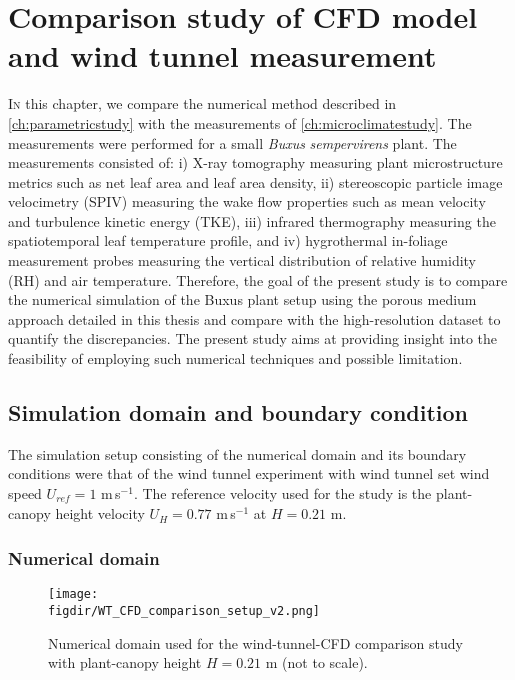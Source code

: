 \chapter{Comparison study of CFD model and wind tunnel measurement}
\label{ch:wtcfdcomparison}
\def\figdir{chapters/ch06_wtcfdcomparison/figures}	


\lettrine[lines=3,nindent=0em,loversize=0.1]{I}{n} this chapter, we compare the numerical method described in \cref{ch:parametricstudy} with the measurements of \cref{ch:microclimatestudy}. The measurements were performed for a small \textit{Buxus} \textit{sempervirens} plant. The measurements consisted of: i) X-ray tomography measuring plant microstructure metrics such as net leaf area and leaf area density, ii) stereoscopic particle image velocimetry (SPIV) measuring the wake flow properties such as mean velocity and turbulence kinetic energy (TKE), iii) infrared thermography measuring the spatiotemporal leaf temperature profile, and iv) hygrothermal in-foliage measurement probes measuring the vertical distribution of relative humidity (RH) and air temperature. Therefore, the goal of the present study is to compare the numerical simulation of the Buxus plant setup using the porous medium approach detailed in this thesis and compare with the high-resolution dataset to quantify the discrepancies. The present study aims at providing insight into the feasibility of employing such numerical techniques and possible limitation.

\section{Simulation domain and boundary condition}

The simulation setup consisting of the numerical domain and its boundary conditions were that of the wind tunnel experiment with wind tunnel set wind speed $U_{\textit{ref}} = 1$ m\,s$^{-1}$. The reference velocity used for the study is the plant-canopy height velocity $U_H = 0.77$ m\,s$^{-1}$ at $H = 0.21$ m.

\subsection{Numerical domain}
	
	\begin{figure}[t]
		\centering
		\texttt{[image: \\figdir/WT\_CFD\_comparison\_setup\_v2.png]}
		\caption{Numerical domain used for the wind-tunnel-CFD comparison study with plant-canopy height $H = 0.21$ m (not to scale).}
		\label{fig:WT_CFD_comparison_setup}
	\end{figure}

